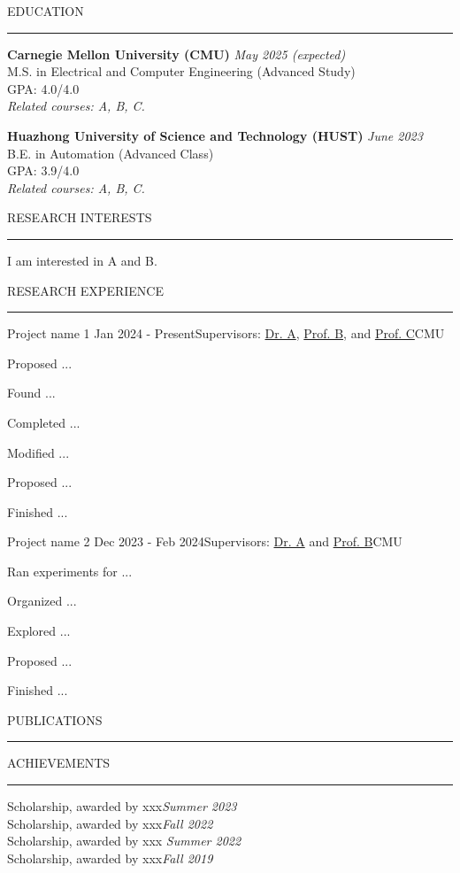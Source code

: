 \documentclass{resume} %
\renewenvironment{rSection}[1]{
\sectionskip
\textcolor{CarnegieMellonRed}{\MakeUppercase{#1}}
\sectionlineskip
\hrule
\begin{list}{}{
\setlength{\leftmargin}{1.5em}
}
\item[]
}{
\end{list}
}
\begin{document}
\begin{rSection}{Education}
{\bf Carnegie Mellon University (CMU)} \hfill {\em May 2025 (expected)} 
\\ M.S. in Electrical and Computer Engineering (Advanced Study)\hfill
\\ GPA: 4.0/4.0 \hfill
\\ \textit{Related courses: A, B, C. }

{\bf Huazhong University of Science and Technology (HUST)} \hfill {\em June 2023} 
\\ B.E. in Automation (Advanced Class)
\\ \qquad GPA: 3.9/4.0\qquad  \hfill
\\ \textit{Related courses: A, B, C. 
}

\end{rSection}

\begin{rSection}{Research Interests}
I am interested in A and B. 
\end{rSection}


\begin{rSection}{Research Experience}
\begin{rSubsection}{Project name 1 \cite{paper1}}{Jan 2024 - Present}{Supervisors: \href{https://example.com/}{Dr. A}, \href{https://example.com/}{Prof. B}, and \href{https://example.com/}{Prof. C}}{CMU}
\item Proposed ...
\item Found ...
\item Completed ...
\item Modified ...
\item Proposed ...
\item Finished ...
\end{rSubsection}


\begin{rSubsection}{Project name 2 \cite{paper2}}{Dec 2023 - Feb 2024}{Supervisors: \href{https://example.weebly.com/}{Dr. A} and \href{https://www.ece.cmu.edu/directory/bios/example}{Prof. B}}{CMU}
\item Ran experiments for ...
\item Organized ...
\item Explored ... 
\item Proposed ...
\item Finished ...
\end{rSubsection}
\end{rSection}


\begin{rSection}{Publications} \itemsep -2pt

\leavevmode\printbibliography[heading=none]

\end{rSection}
\newpage
\begin{rSection}{Achievements} \itemsep -2pt
{Scholarship, awarded by xxx}\hfill {\em Summer 2023} \\
{Scholarship, awarded by xxx}\hfill {\em Fall 2022} \\
{Scholarship, awarded by xxx} \hfill {\em Summer 2022} \\
{Scholarship, awarded by xxx}\hfill {\em Fall 2019}
\end{rSection}
\end{document}
